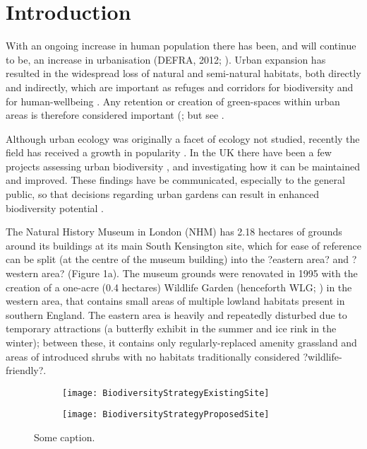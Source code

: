 \section{Introduction}

With an ongoing increase in human population there has been, and will continue to be, an increase in urbanisation (DEFRA, 2012; \citep{unitednations:2014wg}). Urban expansion has resulted in the widespread loss of natural and semi-natural habitats, both directly and indirectly, which are important as refuges and corridors for biodiversity \citep{Goulson:2002oe; Osborne:2008jpe} and for human-wellbeing \citep{Fuller:2007bl, Dallimer:2012bs, Bratman:2015nature, Shanahan:2016sr}. Any retention or creation of green-spaces within urban areas is therefore considered important (\citealt{Alvey:2006uf}; but see \citealt{Dearborn:2010cb}.

Although urban ecology was originally a facet of ecology not studied, recently the field has received a growth in popularity \citep{Mcphearson:2016Bs}.  In the UK there have been a few projects assessing urban biodiversity \citep{Gaston:2004bugs; Angold:2006ste}, and investigating how it can be maintained and improved. These findings have be communicated, especially to the general public, so that decisions regarding urban gardens can result in enhanced biodiversity potential \citep[e.g.][]{Thompson:2007no}.

The Natural History Museum in London (NHM) has 2.18 hectares of grounds around its buildings at its main South Kensington site, which for ease of reference can be split (at the centre of the museum building) into the ?eastern area? and ?western area? (Figure 1a). The museum grounds were renovated in 1995 with the creation of a one-acre (0.4 hectares) Wildlife Garden (henceforth WLG; \citealt{Honey:1999ln}) in the western area, that contains small areas of multiple lowland habitats present in southern England. The eastern area is heavily and repeatedly disturbed due to temporary attractions (a butterfly exhibit in the summer and ice rink in the winter); between these, it contains only regularly-replaced amenity grassland and areas of introduced shrubs with no habitats traditionally considered ?wildlife-friendly?. 

\begin{figure}
	\centering

	\begin{subfigure}[t]{0.45\textwidth}
		\centering
		\texttt{[image: BiodiversityStrategyExistingSite]}
       		 \caption{}\label{fig:fig_a}
	\end{subfigure}
%
	\begin{subfigure}[t]{0.45\textwidth}
		\centering
		\texttt{[image: BiodiversityStrategyProposedSite]}
		\caption{}\label{fig:fig_b}
	\end{subfigure}
	\caption{Some caption.}
\end{figure}

